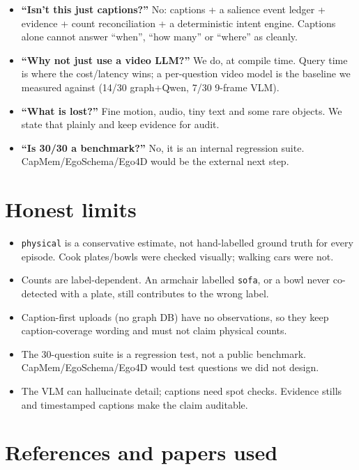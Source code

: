 \documentclass[10pt,a4paper]{article}
\newcommand{\code}[1]{\texttt{\small #1}}
\begin{document}
\begin{itemize}[leftmargin=1.25em,itemsep=1pt]
  \item \textbf{“Isn’t this just captions?”} No: captions + a salience event ledger + evidence + count reconciliation + a deterministic intent engine. Captions alone cannot answer “when”, “how many” or “where” as cleanly.
  \item \textbf{“Why not just use a video LLM?”} We do, at compile time. Query time is where the cost/latency wins; a per-question video model is the baseline we measured against (14/30 graph+Qwen, 7/30 9-frame VLM).
  \item \textbf{“What is lost?”} Fine motion, audio, tiny text and some rare objects. We state that plainly and keep evidence for audit.
  \item \textbf{“Is 30/30 a benchmark?”} No, it is an internal regression suite. CapMem/EgoSchema/Ego4D would be the external next step.
\end{itemize}

\section{Honest limits}

\begin{itemize}[leftmargin=1.25em,itemsep=1pt]
  \item \code{physical} is a conservative estimate, not hand-labelled ground truth for every
        episode. Cook plates/bowls were checked visually; walking cars were not.
  \item Counts are label-dependent. An armchair labelled \code{sofa}, or a bowl never co-detected
        with a plate, still contributes to the wrong label.
  \item Caption-first uploads (no graph DB) have no observations, so they keep caption-coverage
        wording and must not claim physical counts.
  \item The 30-question suite is a regression test, not a public benchmark. CapMem/EgoSchema/Ego4D
        would test questions we did not design.
  \item The VLM can hallucinate detail; captions need spot checks. Evidence stills and timestamped
        captions make the claim auditable.
\end{itemize}

\section{References and papers used}
\end{document}
